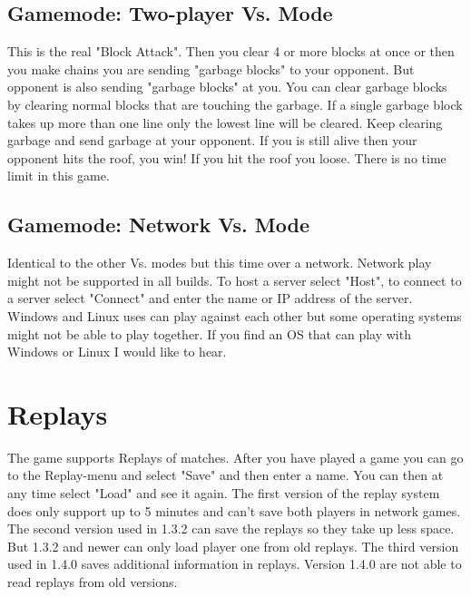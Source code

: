 \documentclass[11pt,a4paper]{article}
\begin{document}
\subsection{Gamemode: Two-player Vs. Mode}
This is the real "Block Attack". Then you clear 4 or more blocks
at once or then you make chains you are sending "garbage blocks"
to your opponent. But opponent is also sending "garbage blocks" at
you. You can clear garbage blocks by clearing normal blocks that
are touching the garbage. If a single garbage block takes up more
than one line only the lowest line will be cleared. Keep clearing
garbage and send garbage at your opponent. If you is still alive
then your opponent hits the roof, you win! If you hit the roof you
loose. There is no time limit in this game.
\subsection{Gamemode: Network Vs. Mode}
Identical to the other Vs. modes but this time over a network. Network play might not be supported in all builds.
\newline To host a server select "Host", to connect to a server select "Connect" and enter the name or IP address of the server.
Windows and Linux uses can play against each other but some operating systems might not be able to play together. If you find an OS that can play with Windows or Linux I would like to hear.

\section{Replays}
The game supports Replays of matches. After you have played a game you can go to the Replay-menu and select "Save" and then enter a name. You can then at any time select "Load" and see it again. The first version of the replay system does only support up to 5 minutes and can't save both players in network games. \newline
The second version used in 1.3.2 can save the replays so they take up less space. But 1.3.2 and newer can only load player one from old replays. \newline
The third version used in 1.4.0 saves additional information in replays. Version 1.4.0 are not able to read replays from old versions.
\end{document}
